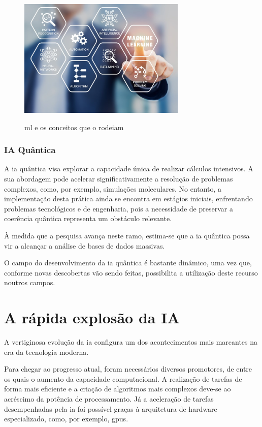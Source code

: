 \documentclass{report}
\begin{document}
\begin{figure}[H]
\caption{\ac{ml} e os conceitos que o rodeiam}
\centering
\includegraphics[width=8cm]{imagens/machine_learning.jpg}
\label{machine_learning}
\end{figure}

\nocite{machinelearning}

\subsubsection{IA Quântica}
\label{subsubsec.ia_quantica}

    A \ac{ia} quântica visa explorar a capacidade única de realizar cálculos intensivos. A sua abordagem pode acelerar significativamente a resolução de problemas complexos, como, por exemplo, simulações moleculares. No entanto, a implementação desta prática ainda se encontra em estágios iniciais, enfrentando problemas tecnológicos e de engenharia, pois a necessidade de preservar a coerência quântica representa um obstáculo relevante. \cite{iaquantica}

    À medida que a pesquisa avança neste ramo, estima-se que a \ac{ia} quântica possa vir a alcançar a análise de bases de dados massivas.
    
	O campo do desenvolvimento da \ac{ia} quântica é bastante dinâmico, uma vez que, conforme novas descobertas vão sendo feitas, possibilita a utilização  deste recurso noutros campos.

\section{A rápida explosão da IA}
\label{sec.a_rapida_explosao_da_ia}

	A vertiginosa evolução da \ac{ia} configura um dos acontecimentos mais marcantes na era da tecnologia moderna.
	
	Para chegar ao progresso atual, foram necessários diversos promotores, de entre os quais o aumento da capacidade computacional. A realização de tarefas de forma mais eficiente e a criação de algoritmos mais complexos deve-se ao acréscimo da potência de processamento. Já a aceleração de tarefas desempenhadas pela \ac{ia} foi possível graças à arquitetura de hardware especializado, como, por exemplo, \ac{gpus}. \cite{acrescimo_potencia}
	
\end{document}
